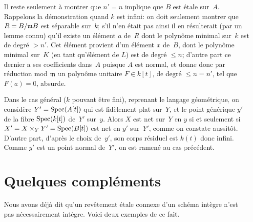 Il reste seulement \`a montrer que $n'=n$ implique que $B$ est
\'etale sur~$A$. Rappelons la d\'emonstration quand $k$ est
infini: on doit seulement montrer que $R=B/\mathfrak{m}B$ est
s\'eparable sur~$k$; s'il n'en \'etait pas ainsi il en
r\'esulterait (par un lemme connu) qu'il existe un \'el\'ement
$a$ de~$R$ dont le polyn\^ome minimal sur~$k$ est de degr\'e
$>n'$. Cet \'el\'ement provient d'un \'el\'ement $x$ de~$B$,
dont le polyn\^ome minimal sur~$K$ (en tant qu'\'el\'ement de
$L$) est de degr\'e $\le n$; d'autre part ce dernier a ses
coefficients dans~$A$ puisque $A$ est normal, et donne donc par
r\'eduction mod $\mathfrak{m}$ un polyn\^ome unitaire $F\in k[t]$, de
degr\'e $\le n=n'$, tel que $F(a)=0$, absurde.

Dans
le cas g\'en\'eral ($k$ pouvant \^etre fini), reprenant le
langage g\'eom\'etrique, on consid\`ere $Y'=\operatorname{Spec}(A[t])$ qui est
fid\`element plat sur~$Y$, et le point g\'en\'erique $y'$ de la
fibre $\operatorname{Spec}(k[t])$ de~$Y'$ sur~$y$. Alors $X$ est net sur~$Y$ en $y$
si et seulement si $X'=X\times_Y Y'=\operatorname{Spec}(B[t])$ est net en $y'$ sur~$Y'$, comme on constate aussit\^ot. D'autre part, d'apr\`es le
choix de~$y'$, son corps r\'esiduel est $k(t)$ donc infini. Comme
$y'$ est un point normal de~$Y'$, on est ramen\'e au cas
pr\'ec\'edent.







\section{Quelques compl\'ements}
\label{I.11}

Nous avons d\'ej\`a dit qu'un rev\^etement \'etale connexe
d'un sch\'ema int\`egre n'est pas n\'e\-ces\-sai\-rement
int\`egre. Voici deux exemples de ce fait.

